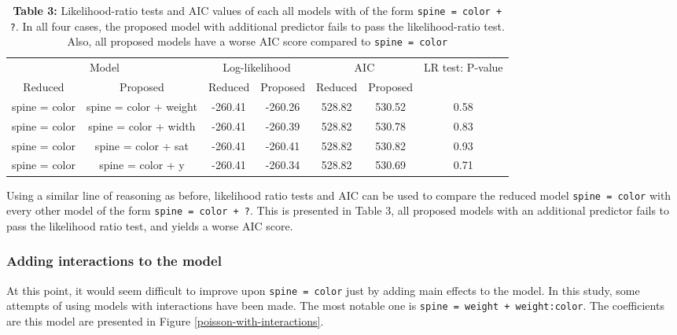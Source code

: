\documentclass[a4paper, 12pt]{article}
\begin{document}
\begin{table}[htbp]
  \centering
    \begin{tabular}{|c|c|c|c|c|c|c|}
    \toprule
    \multicolumn{2}{|p{13.89em}|}{Model} & \multicolumn{2}{p{8em}|}{Log-likelihood} & \multicolumn{2}{p{8em}|}{AIC} & \multicolumn{1}{c|}{\multirow{2}[4]{*}{LR test: P-value}} \\
\cmidrule{1-6}    \multicolumn{1}{|p{5.945em}|}{Reduced} & \multicolumn{1}{p{7.945em}|}{Proposed} & \multicolumn{1}{p{4em}|}{Reduced} & Proposed & \multicolumn{1}{p{4em}|}{Reduced} & \multicolumn{1}{p{4em}|}{Proposed} &  \\
    \midrule
    \multicolumn{1}{|p{5.945em}|}{spine = color} & \multicolumn{1}{p{7.945em}|}{spine = color + weight} & -260.41 & -260.26 & 528.82 & 530.52 & 0.58 \\
    spine = color & \multicolumn{1}{p{7.945em}|}{spine = color + width} & -260.41 & -260.39 & 528.82 & 530.78 & 0.83 \\
    spine = color & spine = color + sat  & -260.41 & -260.41 & 528.82 & 530.82 & 0.93 \\
    spine = color & spine = color + y  & -260.41 & -260.34 & 528.82 & 530.69 & 0.71 \\
    \bottomrule
    \end{tabular}%
    \caption*{\textbf{Table 3:} Likelihood-ratio tests and AIC values of each all models with of the form \texttt{spine = color + ?}. In all four cases, the proposed model with additional predictor fails to pass the likelihood-ratio test. Also, all proposed models have a worse AIC score compared to \texttt{spine = color}}
\end{table}%

Using a similar line of reasoning as before, likelihood ratio tests and AIC can be used to compare the reduced model \texttt{spine = color} with every other model of the form \texttt{spine = color + ?}. This is presented in Table 3, all proposed models with an additional predictor fails to pass the likelihood ratio test, and yields a worse AIC score. \\

\subsubsection{Adding interactions to the model}
\noindent At this point, it would seem difficult to improve upon  \texttt{spine = color} just by adding main effects to the model. In this study, some attempts of using models with interactions have been made. The most notable one is \texttt{spine = weight + weight:color}. The coefficients are this model are presented in Figure \ref{poisson-with-interactions}. 
\end{document}
